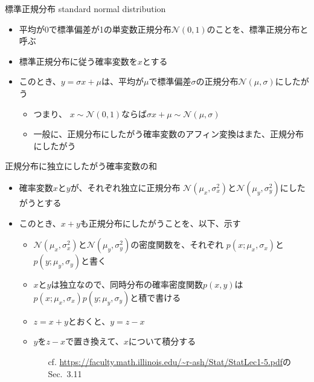 \documentclass[aspectratio=169,unicode,dvipdfmx,14pt]{beamer}
\begin{document}
\begin{frame}{標準正規分布 standard normal distribution}
\begin{itemize}
\item 平均が0で標準偏差が1の単変数正規分布$\mathcal{N}(0,1)$のことを、標準正規分布と呼ぶ
\item 標準正規分布に従う確率変数を$x$とする
\item このとき、$y=\sigma x+\mu$は、平均が$\mu$で標準偏差$\sigma$の正規分布$\mathcal{N}(\mu,\sigma)$にしたがう
\begin{itemize}
\item つまり、 $x\sim\mathcal{N}(0,1)$ならば$\sigma x + \mu\sim\mathcal{N}(\mu,\sigma)$
\item 一般に、正規分布にしたがう確率変数のアフィン変換はまた、正規分布にしたがう
\end{itemize}
\end{itemize}
\end{frame}

\begin{frame}{正規分布に独立にしたがう確率変数の和}
\begin{itemize}
\item 確率変数$x$と$y$が、それぞれ独立に正規分布
$\mathcal{N}(\mu_x,\sigma_x^2)$と$\mathcal{N}(\mu_y,\sigma_y^2)$にしたがうとする
\item このとき、$x+y$も正規分布にしたがうことを、以下、示す
\begin{itemize}
\item $\mathcal{N}(\mu_x,\sigma_x^2)$と$\mathcal{N}(\mu_y,\sigma_y^2)$の密度関数を、それぞれ
$p(x;\mu_x,\sigma_x)$と$p(y;\mu_y,\sigma_y)$と書く
\item $x$と$y$は独立なので、同時分布の確率密度関数$p(x,y)$は$p(x;\mu_x,\sigma_x)p(y;\mu_y,\sigma_y)$と積で書ける
\item $z=x+y$とおくと、$y=z-x$
\item $y$を$z-x$で置き換えて、$x$について積分する
\begin{itemize}
\item[cf.] {\scriptsize \href{https://faculty.math.illinois.edu/\~r-ash/Stat/StatLec1-5.pdf}{\url{https://faculty.math.illinois.edu/~r-ash/Stat/StatLec1-5.pdf}}のSec.~3.11}
\end{itemize}
\end{itemize}
\end{itemize}
\end{frame}
\end{document}
